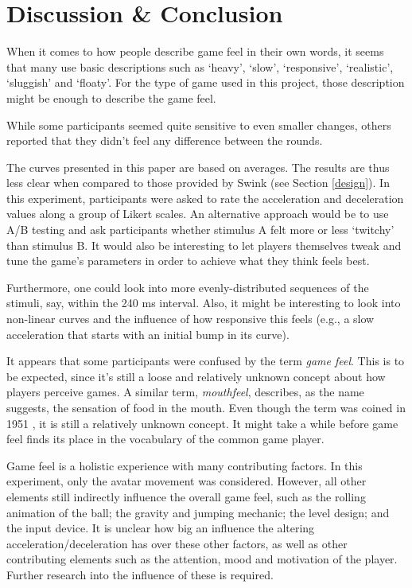 \section{Discussion \& Conclusion} \label{discussion}
When it comes to how people describe game feel in their own words, it seems that many use basic descriptions such as `heavy', `slow', `responsive', `realistic', `sluggish' and `floaty'. For the type of game used in this project, those description might be enough to describe the game feel.


While some participants seemed quite sensitive to even smaller changes, others reported that they didn't feel any difference between the rounds.

The curves presented in this paper are based on averages. The results are thus less clear when compared to those provided by Swink (see Section \ref{design}). In this experiment, participants were asked to rate the acceleration and deceleration values along a group of Likert scales. An alternative approach would be to use A/B testing and ask participants whether stimulus A felt more or less `twitchy' than stimulus B. It would also be interesting to let players themselves tweak and tune the game's parameters in order to achieve what they think feels best.

Furthermore, one could look into more evenly-distributed sequences of the stimuli, say, within the 240 ms interval. Also, it might be interesting to look into non-linear curves and the influence of how responsive this feels (e.g., a slow acceleration that starts with an initial bump in its curve).

It appears that some participants were confused by the term \textit{game feel}. This is to be expected, since it's still a loose and relatively unknown concept about how players perceive games. A similar term, \textit{mouthfeel}, describes, as the name suggests, the sensation of food in the mouth. Even though the term was coined in 1951 \cite{mouthfeel}, it is still a relatively unknown concept. It might take a while before game feel finds its place in the vocabulary of the common game player.

Game feel is a holistic experience with many contributing factors. In this experiment, only the avatar movement was considered. However, all other elements still indirectly influence the overall game feel, such as the rolling animation of the ball; the gravity and jumping mechanic; the level design; and the input device. It is unclear how big an influence the altering acceleration/deceleration has over these other factors, as well as other contributing elements such as the attention, mood and motivation of the player. Further research into the influence of these is required.